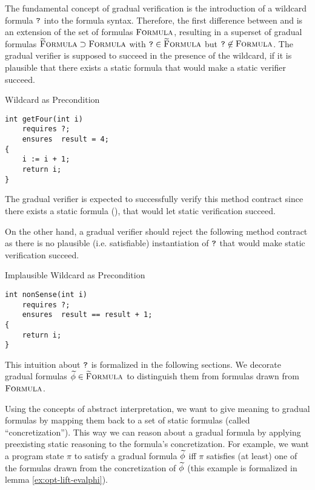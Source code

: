 
The fundamental concept of gradual verification is the introduction of a wildcard formula $\textup{\texttt{?}}$ into the formula syntax.
Therefore, the first difference between \gvl and \svl is an extension of the set of formulas $\textup{\textsc{Formula}}$, resulting in a superset of gradual formulas $\textup{\textsc{\ensuremath{\widetilde{\text{F}}}ormula}} \supset \textup{\textsc{Formula}}$ with $\textup{\texttt{?}} \in \textup{\textsc{\ensuremath{\widetilde{\text{F}}}ormula}}$ but $\textup{\texttt{?}} \not \in \textup{\textsc{Formula}}$.
The gradual verifier is supposed to succeed in the presence of the wildcard, if it is plausible that there exists a static formula that would make a static verifier succeed.
\begin{example}{Wildcard as Precondition}
\begin{lstlisting}
int getFour(int i)
    requires ?;
    ensures  result = 4;
{
    i := i + 1;
    return i;
}
\end{lstlisting}
The gradual verifier is expected to successfully verify this method contract since there exists a static formula (), that would let static verification succeed.
\end{example}

On the other hand, a gradual verifier should reject the following method contract as there is no plausible (i.e. satisfiable) instantiation of $\textup{\texttt{?}}$ that would make static verification succeed.
\begin{example}{Implausible Wildcard as Precondition}
\begin{lstlisting}
int nonSense(int i)
    requires ?;
    ensures  result == result + 1;
{
    return i;
}
\end{lstlisting}
\end{example}

This intuition about $\textup{\texttt{?}}$ is formalized in the following sections.
We decorate gradual formulas $\widetilde{\phi} \in \textup{\textsc{\ensuremath{\widetilde{\text{F}}}ormula}}$ to distinguish them from formulas drawn from $\textup{\textsc{Formula}}$.

Using the concepts of abstract interpretation, we want to give meaning to gradual formulas by mapping them back to a set of static formulas (called “concretization”).
This way we can reason about a gradual formula by applying preexisting static reasoning to the formula's concretization.
For example, we want a program state $\pi$ to satisfy a gradual formula $\widetilde{\phi}$ iff $\pi$ satisfies (at least) one of the formulas drawn from the concretization of $\widetilde{\phi}$ (this example is formalized in lemma \ref{ex:opt-lift-evalphi}).

